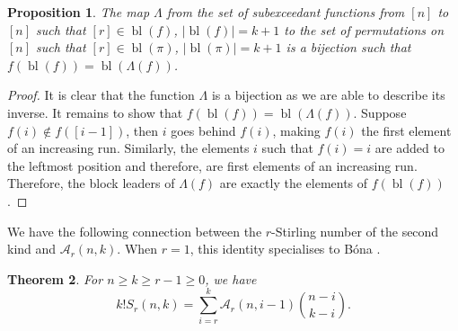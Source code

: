 \documentclass{article}
\newcommand{\eul}{\mathcal{A}}
\DeclareMathOperator{\bl}{bl}
\newtheorem{theorem}{Theorem}[section]
\newtheorem{proposition}[theorem]{Proposition}
\theoremstyle{definition}
\numberwithin{equation}{section}
\begin{document}
\begin{proposition}
    The map $\Lambda$ from the set of subexceedant functions from $[n]$ to $[n]$ such that $[r]\in \bl(f)$, $|\bl(f)|=k+1$ to the set of permutations on $[n]$ such that $[r]\in \bl(\pi)$, $|\bl(\pi)|=k+1$ is a bijection such that $f(\bl(f))=\bl(\Lambda(f))$.
\end{proposition}
\begin{proof}
    It is clear that the function $\Lambda$ is a bijection as we are able to describe its inverse. It remains to show that $f(\bl(f))=\bl(\Lambda(f))$. Suppose $f(i)\notin f([i-1])$, then $i$ goes behind $f(i)$, making $f(i)$ the first element of an increasing run. Similarly, the elements $i$ such that $f(i)=i$ are added to the leftmost position and therefore, are first elements of an increasing run. Therefore, the block leaders of $\Lambda(f)$ are exactly the elements of $f(\bl(f))$.
\end{proof}
We have the following connection between the $r$-Stirling number of the second kind and $\eul_r(n,k)$. When $r=1$, this identity specialises to B\'ona \cite[Theorem 1.18]{bona-combin-permut}.
\begin{theorem} For $n\ge k\ge r-1\ge 0$, we have
    \begin{equation}\label{r-stir-eul}
        k!S_r(n,k)=\sum_{i=r}^{k}\eul_r(n,i-1)\binom{n-i}{k-i}.
    \end{equation}
\end{theorem}
\end{document}
